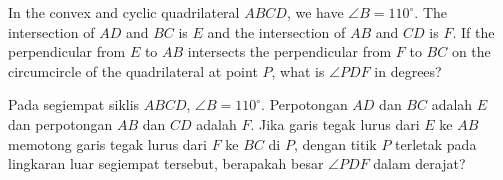 In the convex and cyclic quadrilateral $ABCD$, we have $\angle B = 110^{\circ}$. The intersection of $AD$ and $BC$ is $E$ and the intersection of $AB$ and $CD$ is $F$. If the perpendicular from $E$ to $AB$ intersects the perpendicular from $F$ to $BC$ on the circumcircle of the quadrilateral at point $P$, what is $\angle PDF$ in degrees?

Pada segiempat siklis $ABCD$, $\angle B = 110^{\circ}$. Perpotongan $AD$ dan $BC$ adalah $E$ dan perpotongan $AB$ dan $CD$ adalah $F$. Jika garis tegak lurus dari $E$ ke $AB$ memotong garis tegak lurus dari $F$ ke $BC$ di $P$, dengan titik $P$ terletak pada lingkaran luar segiempat tersebut, berapakah besar $\angle PDF$ dalam derajat?
